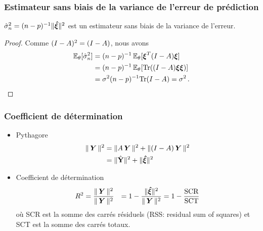 \begin{frame}
\frametitle{Estimateur sans biais de la variance de l'erreur de prédiction}
\begin{theo}
$\hat{\sigma}_n^2= (n-p)^{-1} \| \boldsymbol{\hat{\xi}} \|^2$ est un estimateur sans biais de la variance de l'erreur.
\end{theo}
\begin{proof}
Comme $(I-A)^2= (I-A)$, nous avons
\begin{align*}
\operatorname{{\mathbb E}}_{\theta}[\hat{\sigma}_n^2] &= (n-p)^{-1} \operatorname{{\mathbb E}}_{\theta}[ \boldsymbol{\xi}^T (I-A) \boldsymbol{\xi}] \\
                             &= (n-p)^{-1} \operatorname{{\mathbb E}}_{\theta}[ \mathrm{Tr}( (I-A) \boldsymbol{\xi} \boldsymbol{\xi}) ] \\
                             &= \sigma^2 (n-p)^{-1} \mathrm{Tr}(I-A)= \sigma^2 \,.
\end{align*}
\end{proof}
\end{frame}

\begin{frame}
\frametitle{Coefficient de détermination}
\begin{itemize}
\item \alert{Pythagore} 
\begin{align*}
\| \operatorname{\boldsymbol{Y}} \|^2 &= \| A \operatorname{\boldsymbol{Y}} \|^2 + \| (I - A) \operatorname{\boldsymbol{Y}} \|^2 \\
            &= \| \hat{\mathbf{Y}} \|^2 + \| \boldsymbol{\hat{\xi}} \|^2
\end{align*}
\item \alert{Coefficient de détermination}
\begin{align*}
R^2 &= \frac{\|\operatorname{\boldsymbol{Y}}\|^2}{\|\operatorname{\boldsymbol{Y}}\|^2} 
    &= 1 - \frac{\| \boldsymbol{\hat{\xi}} \|^2}{\|\operatorname{\boldsymbol{Y}}\|^2} = 1 - \frac{\mathrm{SCR}}{\mathrm{SCT}}
\end{align*}
où \alert{SCR} est la somme des carrés résiduels (RSS: residual sum of squares) et \alert{SCT} est la somme des carrés totaux.
\end{itemize}
\end{frame}





